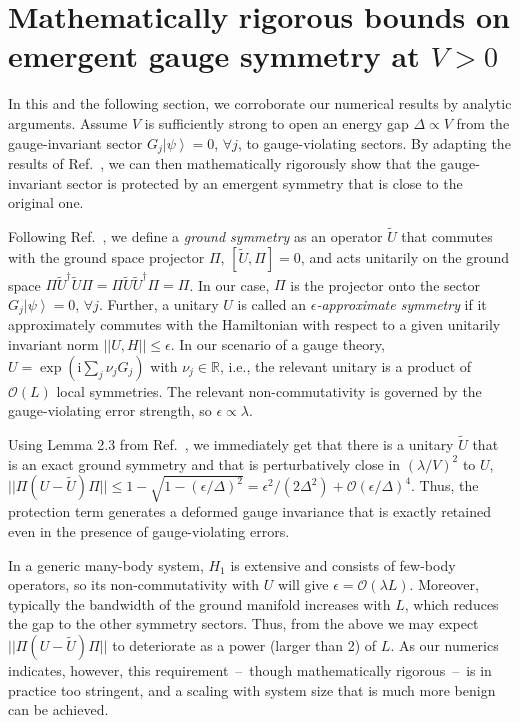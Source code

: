 \documentclass[aps,prl,reprint,twocolumn,superscriptaddress,floatfix,nofootinbib]{revtex4-1}
\begin{document}
\section{Mathematically rigorous bounds on emergent gauge symmetry at $V>0$}
In this and the following section, we corroborate our numerical results by analytic arguments. Assume $V$ is sufficiently strong to open an energy gap $\Delta\propto V$ from the gauge-invariant sector $G_j\left|\psi\right\rangle=0$, $\forall j$, to gauge-violating sectors. By adapting the results of Ref.~\cite{Chubb2017-S}, we can then mathematically rigorously show that the gauge-invariant sector is protected by an emergent symmetry that is close to the original one.  

Following Ref.~\cite{Chubb2017-S}, we define a \emph{ground symmetry} as an operator $\tilde U$ that commutes 
with the ground space projector ${\Pi}$, 
$[ {\tilde U},{\Pi}]=0$, 
and acts unitarily on the ground space $\Pi \tilde U^\dag \tilde U\Pi=\Pi \tilde U\tilde U^\dag \Pi=\Pi$. 
In our case, $\Pi$ is the projector onto the sector $G_j\left|\psi\right\rangle=0$, $\forall j$. 
%
Further, a unitary $U$ is called an \emph{$\epsilon$-approximate symmetry} if it approximately commutes with the Hamiltonian with respect to a given unitarily invariant norm
$ || {{U},{H}}||\leq \epsilon$. 
In our scenario of a gauge theory, $U=\exp(\mathrm{i} \sum_j \nu_j G_j)$ with $\nu_j\in\mathbb{R}$, i.e., the relevant unitary is a product of $\mathcal{O}(L)$ local symmetries. 
The relevant non-commutativity is governed by the gauge-violating error strength, so $\epsilon\propto\lambda$. 


Using Lemma 2.3 from Ref.~\cite{Chubb2017-S}, we immediately get that there is a unitary $\tilde U$ that is an exact ground symmetry and that is perturbatively close in $(\lambda/V)^2$ to $U$, 
$||{\Pi\left(U-\tilde{U}\right)\Pi}||\leq 1-\sqrt{1-\left(\epsilon/\Delta\right)^2}=\epsilon^2/(2\Delta^2)+\mathcal{O}(\epsilon/\Delta)^4$.  
Thus, the protection term generates a deformed gauge invariance that is exactly retained even in the presence of gauge-violating errors. 

In a generic many-body system, $H_1$ is extensive and consists of few-body operators, so its non-commutativity with $U$ will give $\epsilon=\mathcal{O}(\lambda L)$. Moreover, typically the bandwidth of the ground manifold increases with $L$, which reduces the gap to the other symmetry sectors. Thus, from the above we may expect $||{\Pi\left(U-\tilde{U}\right)\Pi}||$ to deteriorate as a power (larger than 2) of $L$. 
As our numerics indicates, however, this requirement~--~though mathematically rigorous~--~is in practice too stringent, and a scaling with system size that is much more benign can be achieved. 
\end{document}
